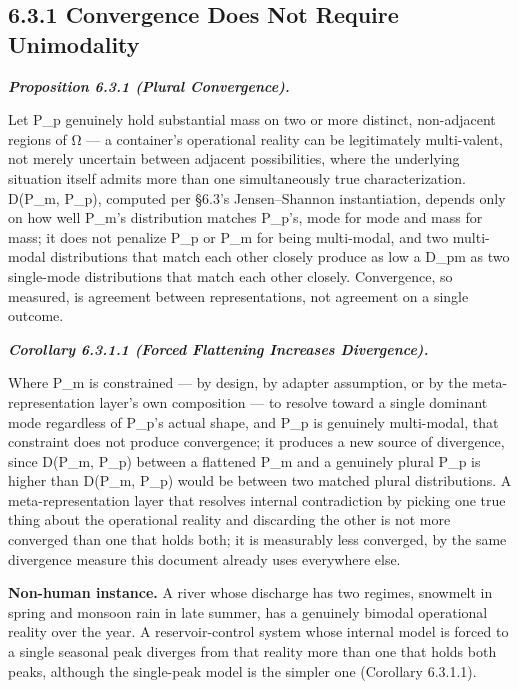 \documentclass[
]{article}
\begin{document}
\hypertarget{convergence-does-not-require-unimodality}{%
\subsection{6.3.1 Convergence Does Not Require
Unimodality}\label{convergence-does-not-require-unimodality}}

\emph{\textbf{Proposition 6.3.1 (Plural Convergence).}}

Let P\_p genuinely hold substantial mass on two or more distinct,
non-adjacent regions of Ω --- a container's operational reality can be
legitimately multi-valent, not merely uncertain between adjacent
possibilities, where the underlying situation itself admits more than
one simultaneously true characterization. D(P\_m, P\_p), computed per
§6.3's Jensen--Shannon instantiation, depends only on how well P\_m's
distribution matches P\_p's, mode for mode and mass for mass; it does
not penalize P\_p or P\_m for being multi-modal, and two multi-modal
distributions that match each other closely produce as low a D\_pm as
two single-mode distributions that match each other closely.
Convergence, so measured, is agreement between representations, not
agreement on a single outcome.

\emph{\textbf{Corollary 6.3.1.1 (Forced Flattening Increases
Divergence).}}

Where P\_m is constrained --- by design, by adapter assumption, or by
the meta-representation layer's own composition --- to resolve toward a
single dominant mode regardless of P\_p's actual shape, and P\_p is
genuinely multi-modal, that constraint does not produce convergence; it
produces a new source of divergence, since D(P\_m, P\_p) between a
flattened P\_m and a genuinely plural P\_p is higher than D(P\_m, P\_p)
would be between two matched plural distributions. A meta-representation
layer that resolves internal contradiction by picking one true thing
about the operational reality and discarding the other is not more
converged than one that holds both; it is measurably less converged, by
the same divergence measure this document already uses everywhere else.

\textbf{Non-human instance.} A river whose discharge has two regimes,
snowmelt in spring and monsoon rain in late summer, has a genuinely
bimodal operational reality over the year. A reservoir-control system
whose internal model is forced to a single seasonal peak diverges from
that reality more than one that holds both peaks, although the
single-peak model is the simpler one (Corollary 6.3.1.1).
\end{document}
